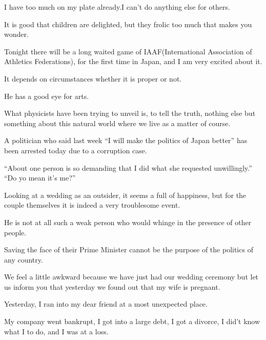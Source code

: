 \item[228.] I have too much on my plate already.I can't do anything else for others.
\item[229.] It is good that children are delighted, but they frolic too much that makes you wonder.
\item[230.] Tonight there will be a long waited game of IAAF(International Association of Athletics Federations), for the first time in Japan, and I am very excited about it.
\item[231.] It depends on circumstances whether it is proper or not.
\item[232.] He has a good eye for arts.
\item[233.] What physicists have been trying to unveil is, to tell the truth,  nothing else but something about this natural world where we live as a matter of course.
\item[234.] A politician who said last week ``I will make the politics of Japan better'' has been arrested today due to a corruption case.
\item[235.] ``About one person is so demanding that I did what she requested unwillingly.'' ``Do yo mean it's me?''
\item[236.] Looking at a wedding as an outsider, it seems a full of happiness, but for the couple themselves it is indeed a very troublesome event.
\item[237.] He is not at all such a weak person who would whinge in the presence of other people.
\item[238.] Saving the face of their Prime Minister cannot be the purpose of the politics of any country.
\item[239.] We feel a little awkward because we have just had our wedding ceremony but let us inform you that yesterday we found out that my wife is pregnant.
\item[240.] Yesterday, I ran into my dear friend at a most unexpected place.
\item[241.] My company went bankrupt, I got into a large debt, I got a divorce, I did't know what I to do, and I was at a loss.
\fi